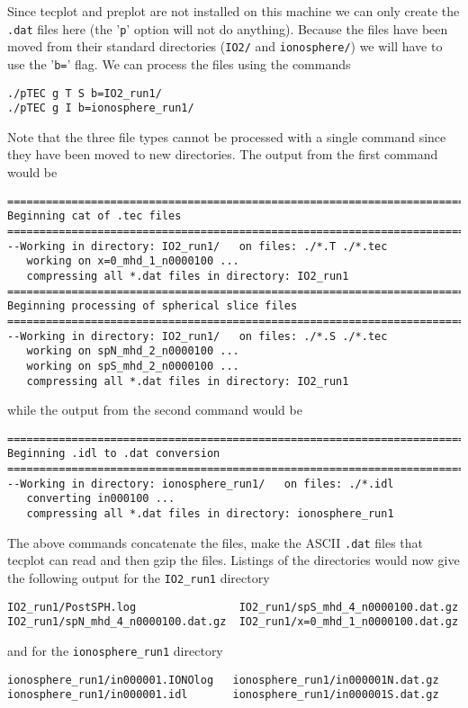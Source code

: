 Since tecplot and preplot are not installed on this machine we can
only create the {\tt .dat} files here (the '{\tt p}' option will not
do anything).  Because the files have been moved from their standard
directories ({\tt IO2/} and {\tt ionosphere/}) we will have to use
the '{\tt b=}' flag.  We can process the files using the commands
\begin{verbatim}
./pTEC g T S b=IO2_run1/
./pTEC g I b=ionosphere_run1/
\end{verbatim}
Note that the three file types cannot be processed with a single command
since they have been moved to new directories.  The output from the first
command would be
\begin{verbatim}
========================================================================
Beginning cat of .tec files                                             
========================================================================
--Working in directory: IO2_run1/   on files: ./*.T ./*.tec
   working on x=0_mhd_1_n0000100 ...
   compressing all *.dat files in directory: IO2_run1
========================================================================
Beginning processing of spherical slice files                           
========================================================================
--Working in directory: IO2_run1/   on files: ./*.S ./*.tec
   working on spN_mhd_2_n0000100 ...
   working on spS_mhd_2_n0000100 ...
   compressing all *.dat files in directory: IO2_run1
\end{verbatim}
while the output from the second command would be
\begin{verbatim}
========================================================================
Beginning .idl to .dat conversion                                       
========================================================================
--Working in directory: ionosphere_run1/   on files: ./*.idl
   converting in000100 ...
   compressing all *.dat files in directory: ionosphere_run1
\end{verbatim}
The above commands concatenate the files, make the ASCII {\tt .dat} files
that tecplot can read and then gzip the files. Listings of the directories
would now give the following output for the {\tt IO2\_run1} directory
\begin{verbatim}
IO2_run1/PostSPH.log                IO2_run1/spS_mhd_4_n0000100.dat.gz
IO2_run1/spN_mhd_4_n0000100.dat.gz  IO2_run1/x=0_mhd_1_n0000100.dat.gz
\end{verbatim}
and for the {\tt ionosphere\_run1} directory
\begin{verbatim}
ionosphere_run1/in000001.IONOlog   ionosphere_run1/in000001N.dat.gz  
ionosphere_run1/in000001.idl       ionosphere_run1/in000001S.dat.gz  
\end{verbatim}

